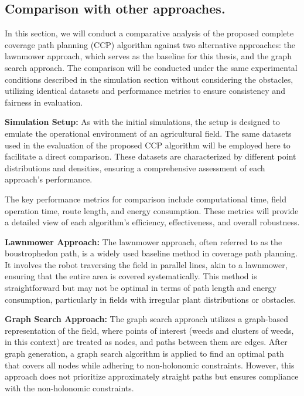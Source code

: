 
\subsection{Comparison with other approaches.}

In this section, we will conduct a comparative analysis of the proposed complete coverage path planning (CCP) algorithm against two alternative approaches: the lawnmower approach, which serves as the baseline for this thesis, and the graph search approach. The comparison will be conducted under the same experimental conditions described in the simulation section without considering the obstacles, utilizing identical datasets and performance metrics to ensure consistency and fairness in evaluation.

\vspace*{6mm}   

\textbf{Simulation Setup: } As with the initial simulations, the setup is designed to emulate the operational environment of an agricultural field. The same datasets used in the evaluation of the proposed CCP algorithm will be employed here to facilitate a direct comparison. These datasets are characterized by different point distributions and densities, ensuring a comprehensive assessment of each approach’s performance.

\vspace*{6mm}   

The key performance metrics for comparison include computational time, field operation time, route length, and energy consumption. These metrics will provide a detailed view of each algorithm's efficiency, effectiveness, and overall robustness.

\vspace*{6mm}    

\textbf{Lawnmower Approach: }The lawnmower approach, often referred to as the boustrophedon path, is a widely used baseline method in coverage path planning. It involves the robot traversing the field in parallel lines, akin to a lawnmower, ensuring that the entire area is covered systematically. This method is straightforward but may not be optimal in terms of path length and energy consumption, particularly in fields with irregular plant distributions or obstacles.

\vspace*{6mm}   

\textbf{Graph Search Approach:} The graph search approach utilizes a graph-based representation of the field, where points of interest (weeds and clusters of weeds, in this context) are treated as nodes, and paths between them are edges. After graph generation, a graph search algorithm is applied to find an optimal path that covers all nodes while adhering to non-holonomic constraints. However, this approach does not prioritize approximately straight paths but ensures compliance with the non-holonomic constraints.  


